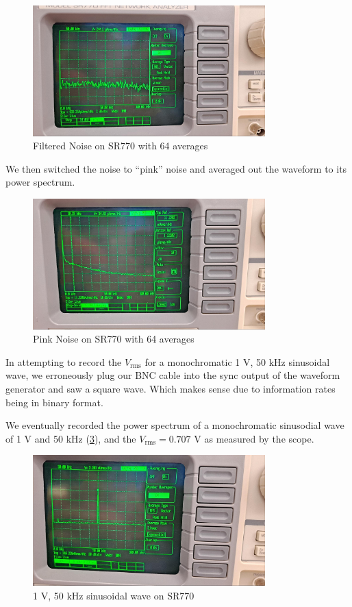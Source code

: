 \documentclass[../main.tex]{subfiles}
\begin{document}
\begin{figure}[ht]
    \centering
    \includegraphics[width=0.8\textwidth]{fig1_5.jpg}
    \caption{Filtered Noise on SR770 with 64 averages}
    \label{fig:1.5}
\end{figure}

We then switched the noise to “pink” noise and averaged out the waveform to its power spectrum.

\begin{figure}[ht]
    \centering
    \includegraphics[width=0.8\textwidth]{fig1_6.jpg}
    \caption{Pink Noise on SR770 with 64 averages}
    \label{fig:1.6}
\end{figure}

In attempting to record the $V_\text{rms}$ for a monochromatic 1 V, 50 kHz sinusoidal wave,
we erroneously plug our BNC cable into the sync output of the waveform generator and saw a square wave.
Which makes sense due to information rates being in binary format.

\newpage
We eventually recorded the power spectrum of a monochromatic sinusodial wave of 1 V and 50 kHz (\ref{fig:1.7}), and the $V_\text{rms} = 0.707$ V as measured
by the scope. 

\begin{figure}[ht]
    \centering
    \includegraphics[width=0.8\textwidth]{fig1_7.jpg}
    \caption{1 V, 50 kHz sinusoidal wave on SR770}
    \label{fig:1.7}
\end{figure}
\end{document}
